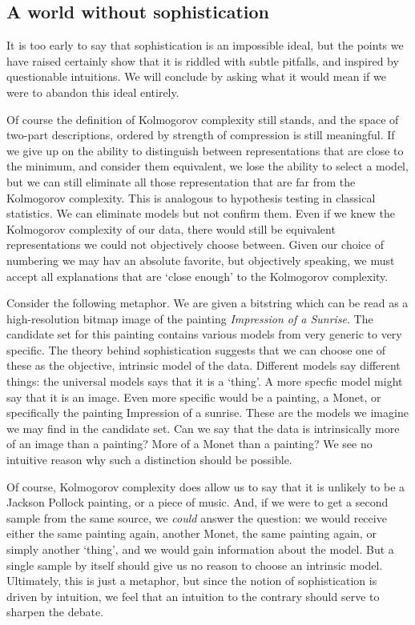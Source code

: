 \documentclass{style/llncs}
\begin{document}
\subsection{A world without sophistication}

It is too early to say that sophistication is an impossible ideal, but the points we have raised certainly show that it is riddled with subtle pitfalls, and inspired by questionable intuitions. We will conclude by asking what it would mean if we were to abandon this ideal entirely.

Of course the definition of Kolmogorov complexity still stands, and the space of two-part descriptions, ordered by strength of compression is still meaningful. If we give up on the ability to distinguish between representations that are close to the minimum, and consider them equivalent, we lose the ability to select a model, but we can still eliminate all those representation that are far from the Kolmogorov complexity. This is analogous to hypothesis testing in classical statistics. We can eliminate models but not confirm them. Even if we knew the Kolmogorov complexity of our data, there would still be equivalent representations we could not objectively  choose between. Given our choice of numbering we may hav an absolute favorite, but objectively speaking, we must accept all explanations that are `close enough' to the Kolmogorov complexity.

Consider the following metaphor. We are given a bitstring which can be read as a high-resolution bitmap image of the painting \emph{Impression of a Sunrise}. The candidate set for this painting contains various models from very generic to very specific. The theory behind sophistication suggests that we can choose one of these as the objective, intrinsic model of the data. Different models say different things: the universal models says that it is a `thing'. A more specfic model might say that it is an image. Even more specific would be a painting, a Monet, or specifically the painting Impression of a sunrise. These are the models we imagine we may find in the candidate set. Can we say that the data is intrinsically more of an image than a painting? More of a Monet than a painting? We see no intuitive reason why such a distinction should be possible.    

Of course, Kolmogorov complexity does allow us to say that it is unlikely to be a Jackson Pollock painting, or a piece of music. And, if we were to get a second sample from the same source, we \emph{could} answer the question: we would receive either the same painting again, another Monet, the same painting again, or simply another `thing', and we would gain information about the model. But a single sample by itself should give us no reason to choose an intrinsic model. Ultimately, this is just a metaphor, but since the notion of sophistication is driven by intuition, we feel that an intuition to the contrary should serve to sharpen the debate.
\end{document}
